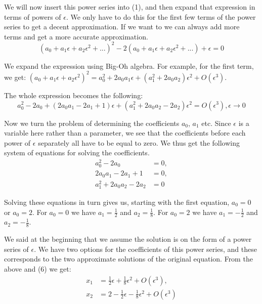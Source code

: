 \documentclass[12pt]{article}
\begin{document}
We will now insert this power series into (1), and then expand that expression
in terms of powers of $\epsilon$. We only have to do this for the first few
terms of the power series to get a decent approximation. If we want to we can
always add more terms and get a more accurate approximation.
\begin{equation}
(a_0 + a_1 \epsilon + a_2 \epsilon^2 + ...)^2 - 2(a_0 + a_1 \epsilon + a_2
\epsilon^2 + ...) + \epsilon = 0
\end{equation}

We expand the expression using Big-Oh algebra. For example, for the
first term, we get: $(a_0 + a_1 \epsilon + a_2 \epsilon^2)^2 = a_0^2 +
2 a_0 a_1 \epsilon + (a_1^2 + 2 a_0 a_2) \epsilon^2 + O(\epsilon^3)$.

The whole expression becomes the following:
\begin{equation}
a_0^2 - 2 a_0 + (2 a_0 a_1 - 2 a_1 + 1)\epsilon + (a_1^2 + 2 a_0 a_2 - 2 a_2)
\epsilon^2 = O(\epsilon^3), \epsilon \to 0
\end{equation}

Now we turn the problem of determining the coefficients $a_0$, $a_1$ etc. Since
$\epsilon$ is a variable here rather than a parameter, we see that the
coefficients before each power of $\epsilon$ separately all have to be equal to
zero. We thus get the following system of equations for solving the coefficients.
\begin{align}
a_0^2 - 2 a_0 &=0, \\
2 a_0 a_1 - 2 a_1 + 1 &= 0, \\
a_1^2 + 2 a_0 a_2 - 2 a_2 &= 0
\end{align}

Solving these equations in turn gives us, starting with the first
equation, $a_0 = 0$ or $a_0 = 2$. For $a_0 = 0$ we have $a_1 =
\frac{1}{2}$ and $a_2 = \frac{1}{8}$. For $a_0 = 2$ we have $a_1 = -
\frac{1}{2}$ and $a_2 = - \frac{1}{8}$.

We said at the beginning that we assume the solution is on the form of
a power series of $\epsilon$. We have two options for the coefficients
of this power series, and these corresponds to the two approximate
solutions of the original equation. From the above and (6) we get:
\begin{align}
x_1 &= \frac{1}{2} \epsilon + \frac{1}{8} \epsilon^2 + O(\epsilon^3), \\
x_2 &= 2 - \frac{1}{2} \epsilon - \frac{1}{8} \epsilon^2 + O(\epsilon^3)
\end{align}
\end{document}
